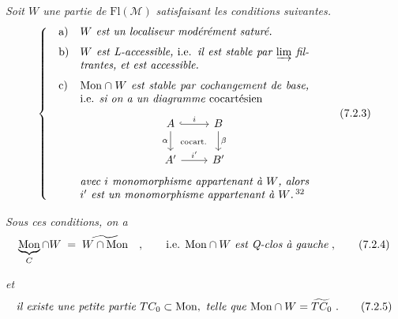 \documentclass[11pt]{article}
\newcommand{\printedpage}[1]{\marginpar{\raggedright\footnotesize p.~#1}}
\newcommand{\msp}[1]{\marginpar{\raggedright\footnotesize [#1]}}
\newcommand{\M}{\mathcal{M}}
\newcommand{\Fl}{\mathrm{Fl}}
\newcommand{\Mon}{\mathrm{Mon}}
\begin{document}
\textit{Soit $W$ une partie de} $\Fl(\M)$ \textit{satisfaisant les conditions suivantes.}
\[
\left\{
\begin{array}{@{\quad}l@{\quad}p{0.6\textwidth}}
\text{a)} & \textit{$W$ est un localiseur modérément saturé.} \\[1.5ex]
\text{b)} & \textit{$W$ est L-accessible,} i.e. \textit{il est stable par $\varinjlim$ filtrantes, et est accessible.} \\[1.5ex]
\text{c)} & $\Mon \cap W$ \textit{est stable par cochangement de base,} i.e. \textit{si on a un diagramme} cocartésien
\begin{center}
\begin{tikzcd}[ampersand replacement=\&]
A \arrow[r, hook, "i"] \arrow[d, "\alpha"'] \arrow[dr, phantom, "\scriptstyle\text{cocart.}"] \& B \arrow[d, "\beta"] \\
A' \arrow[r, "i'"] \& B'
\end{tikzcd}
\end{center}
\textit{avec $i$ monomorphisme appartenant à $W$, alors $i'$ est un monomorphisme appartenant à $W$.}\,\footnotemark[32]
\end{array}
\right.
\tag*{(7.2.3)}
\]

\msp{page 89}
\textit{Sous ces conditions, on a}
\[
\underbrace{\Mon}_{C} \cap W \;=\; \widetilde{W \cap \Mon} \quad , \qquad \text{i.e. } \Mon \cap W \text{ \textit{est Q-clos à gauche}} \;,
\tag*{(7.2.4)}
\]

\printedpage{49}

\textit{et}
\[
\text{\textit{il existe une petite partie} } TC_0 \subset \Mon, \text{ \textit{telle que} } \Mon \cap W = \widetilde{TC_0}\ . \tag*{(7.2.5)} %
\]
\end{document}
